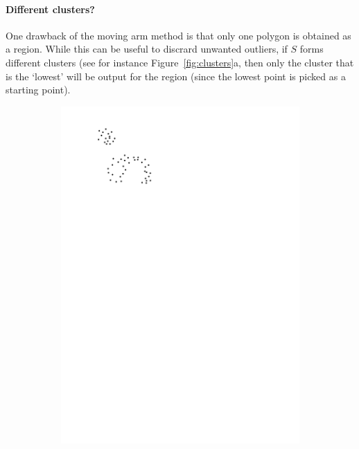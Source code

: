\paragraph{Different clusters?} 
One drawback of the moving arm method is that only one polygon is obtained as a region.
While this can be useful to discrard unwanted outliers, if $S$ forms different clusters (see for instance Figure~\ref{fig:clusters}a, then only the cluster that is the `lowest' will be output for the region (since the lowest point is picked as a starting point).
\begin{figure}
  \centering
  \begin{subfigure}[b]{0.35\linewidth}
    \centering
    \includegraphics[page=1,width=\textwidth]{figs/clusters.pdf}
    \caption{}
  \end{subfigure}
  \qquad \qquad
  \begin{subfigure}[b]{0.35\linewidth}

\end{subfigure}
\end{figure}
